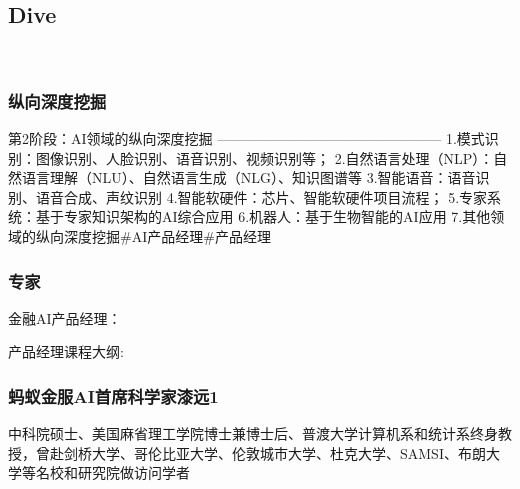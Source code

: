 \documentclass[letterpaper,11pt,english]{sphinxmanual}
\begin{document}
\subsection{Dive}
\label{\detokenize{chapter_dive/index:dive}}\label{\detokenize{chapter_dive/index:chap-dive}}\label{\detokenize{chapter_dive/index::doc}}
​


\subsubsection{纵向深度挖掘}
\label{\detokenize{chapter_dive/zongshen:id1}}\label{\detokenize{chapter_dive/zongshen::doc}}
第2阶段：AI领域的纵向深度挖掘 ————————————————
1.模式识别：图像识别、人脸识别、语音识别、视频识别等；
2.自然语言处理（NLP）：自然语言理解（NLU）、自然语言生成（NLG）、知识图谱等
3.智能语音：语音识别、语音合成、声纹识别
4.智能软硬件：芯片、智能软硬件项目流程；
5.专家系统：基于专家知识架构的AI综合应用 6.机器人：基于生物智能的AI应用
7.其他领域的纵向深度挖掘\#​AI产品经理​\#​产品经理


\subsubsection{专家}
\label{\detokenize{chapter_dive/expert:id1}}\label{\detokenize{chapter_dive/expert::doc}}

金融AI产品经理： 

产品经理课程大纲: 



\subsubsection{蚂蚁金服AI首席科学家漆远1\sphinxfootnotemark[302]}
\label{\detokenize{chapter_dive/qi_yuan:ai1}}\label{\detokenize{chapter_dive/qi_yuan::doc}}%
\begin{footnotetext}[302]\sphinxAtStartFootnote
{}
%
\end{footnotetext}\ignorespaces 
中科院硕士、美国麻省理工学院博士兼博士后、普渡大学计算机系和统计系终身教授，曾赴剑桥大学、哥伦比亚大学、伦敦城市大学、杜克大学、SAMSI、布朗大学等名校和研究院做访问学者
\end{document}
